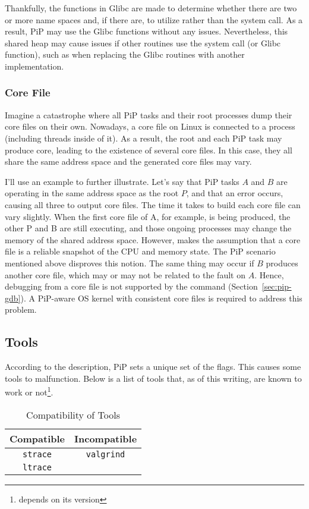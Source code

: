 Thankfully, the  functions in Glibc are made to
determine whether there are two or more name spaces and, if there are,
to utilize  rather than the  system
call. As a result, PiP may use the Glibc  functions
without any issues. Nevertheless, this shared heap may cause issues if
other routines use the  system call (or
 Glibc function), such as when replacing the 
Glibc  routines with another 
implementation. 

\subsubsection{Core File}

Imagine a catastrophe where all PiP tasks and their root processes
dump their core files on their own. Nowadays, a core file on Linux is
connected to a process (including threads inside of it). As a result,
the root and each PiP task may produce core, leading to the existence
of several core files. In this case, they all share the same address
space and the generated core files may vary.

I'll use an example to further illustrate. Let's say that PiP tasks $A$
and $B$ are operating in the same address space as the root $P$, and
that an error occurs, causing all three to output core files. The time it
takes to build each core file can vary slightly. When the first core
file of A, for example, is being produced, the other P and B are still
executing, and those ongoing processes may change the memory of the
shared address space. However,  makes the assumption
that a core file is a reliable snapshot of the CPU and memory
state. The PiP scenario mentioned above disproves this notion. The
same thing may occur if $B$ produces another core file, which may or may
not be related to the fault on $A$. Hence, debugging from a core file is
not supported by the  command
(Section~\ref{sec:pip-gdb}). A PiP-aware OS kernel with consistent
core files is required to address this problem.  

\subsection{Tools}

According to the description, PiP sets a unique set of the
 flags. This causes some tools to malfunction. Below
is a list of tools that, as of this writing, are known to work or
not\footnote{ depends on its version}.  

\begin{table}[ht]
  \centering
  \caption{Compatibility of Tools}
  \vspace{3mm}
  \begin{tabular}{c|c}
    \hline
    Compatible & Incompatible \\
    \hline
        {\tt strace} & {\tt valgrind} \\
        {\tt ltrace} \\
        \hline
  \end{tabular}
\end{table}
